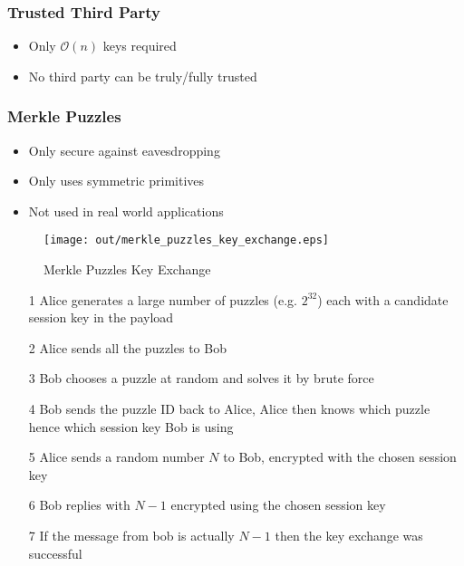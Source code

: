\documentclass[a4paper]{article}
\begin{document}
\subsubsection{Trusted Third Party}

\begin{itemize}
  \item Only $\mathcal{O}(n)$ keys required
  \item No third party can be truly/fully trusted
\end{itemize}

\subsubsection{Merkle Puzzles}

\begin{itemize}
  \item Only secure against eavesdropping
  \item Only uses symmetric primitives
  \item Not used in real world applications
\end{itemize}

\begin{figure}[h!]
  \centering
  \texttt{[image: out/merkle\_puzzles\_key\_exchange.eps]}
  \caption{Merkle Puzzles Key Exchange}
  \label{fig:merkle_puzzles_key_exchange}
\end{figure}
\FloatBarrier


\begin{enumerate}
  \item[1] Alice generates a large number of puzzles (e.g. $2^{32}$) each with a
           candidate session key in the payload
  \item[2] Alice sends all the puzzles to Bob
  \item[3] Bob chooses a puzzle at random and solves it by brute force
  \item[4] Bob sends the puzzle ID back to Alice, Alice then knows which puzzle
           hence which session key Bob is using
  \item[5] Alice sends a random number $N$ to Bob, encrypted with the
           chosen session key
  \item[6] Bob replies with $N-1$ encrypted using the chosen session key
  \item[7] If the message from bob is actually $N-1$ then the key exchange was
           successful
\end{enumerate}
\end{document}
